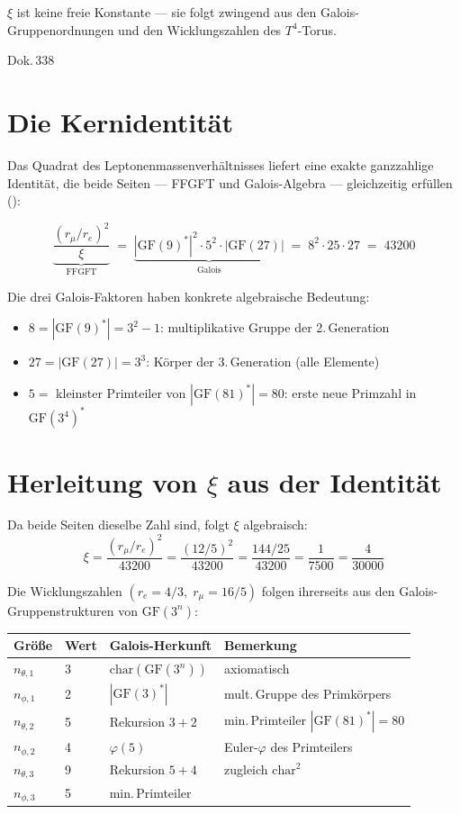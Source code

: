 \label{ch:xi_galois}

\epigraph{$\xi$ ist keine freie Konstante --- sie folgt zwingend aus den
Galois-Gruppenordnungen und den Wicklungszahlen des $T^4$-Torus.}{Dok.\,338}

\section{Die Kernidentität}

Das Quadrat des Leptonenmassenverhältnisses liefert eine exakte ganzzahlige
Identität, die beide Seiten --- FFGFT und Galois-Algebra --- gleichzeitig
erfüllen ():

\[
\boxed{
  \underbrace{\frac{(r_\mu/r_e)^2}{\xi}}_{\text{FFGFT}}
  \;=\;
  \underbrace{|\mathrm{GF}(9)^*|^2 \cdot 5^2 \cdot |\mathrm{GF}(27)|}_{\text{Galois}}
  \;=\; 8^2 \cdot 25 \cdot 27 \;=\; 43200
}
\]

Die drei Galois-Faktoren haben konkrete algebraische Bedeutung:
\begin{itemize}
  \item $8 = |\mathrm{GF}(9)^*| = 3^2 - 1$: multiplikative Gruppe der 2.\,Generation
  \item $27 = |\mathrm{GF}(27)| = 3^3$: Körper der 3.\,Generation (alle Elemente)
  \item $5 = $ kleinster Primteiler von $|\mathrm{GF}(81)^*| = 80$:
    erste neue Primzahl in $\mathrm{GF}(3^4)^*$
\end{itemize}

\section{Herleitung von \texorpdfstring{$\xi$}{xi} aus der Identität}

Da beide Seiten dieselbe Zahl sind, folgt $\xi$ algebraisch:
\[
  \xi = \frac{(r_\mu/r_e)^2}{43200}
  = \frac{(12/5)^2}{43200}
  = \frac{144/25}{43200}
  = \frac{1}{7500}
  = \frac{4}{30000}
\]

Die Wicklungszahlen $(r_e = 4/3,\; r_\mu = 16/5)$ folgen ihrerseits
aus den Galois-Gruppenstrukturen von $\mathrm{GF}(3^n)$:

\begin{center}
\begingroup\small
\begin{tabular}{@{}p{1.2cm}p{0.8cm}p{2.8cm}p{2.8cm}@{}}
\toprule
Größe & Wert & Galois-Herkunft & Bemerkung \\
\midrule
$n_{\theta,1}$ & 3 & $\mathrm{char}(\mathrm{GF}(3^n))$ & axiomatisch \\
$n_{\phi,1}$   & 2 & $|\mathrm{GF}(3)^*|$ & mult.\,Gruppe des Primkörpers \\
$n_{\theta,2}$ & 5 & Rekursion $3+2$ & min.\,Primteiler $|\mathrm{GF}(81)^*|=80$ \\
$n_{\phi,2}$   & 4 & $\varphi(5)$ & Euler-$\varphi$ des Primteilers \\
$n_{\theta,3}$ & 9 & Rekursion $5+4$ & zugleich $\mathrm{char}^2$ \\
$n_{\phi,3}$   & 5 & min.\,Primteiler & \\
\bottomrule
\end{tabular}
\endgroup
\end{center}

